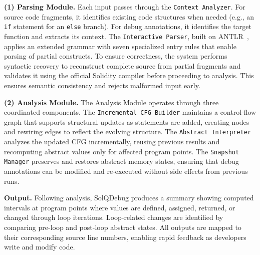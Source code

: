 \documentclass[pdflatex,sn-basic]{sn-jnl}%
\theoremstyle{thmstyleone}%
\theoremstyle{thmstyletwo}%
\theoremstyle{thmstylethree}%
\begin{document}
        \smallskip
        \noindent\textbf{(1) Parsing Module.}
        Each input passes through the \texttt{Context Analyzer}. For source code fragments,
        it identifies existing code structures when needed
        (e.g., an \texttt{if} statement for an \texttt{else} branch).
        For debug annotations, it identifies the target function and extracts its context.
        The \texttt{Interactive Parser}, built on ANTLR~\citep{antlr}, applies an extended grammar with seven specialized
        entry rules that enable parsing of partial constructs. To ensure correctness,
        the system performs syntactic recovery to reconstruct complete source from partial fragments and
        validates it using the official Solidity compiler before proceeding to analysis. This ensures
        semantic consistency and rejects malformed input early.

        \smallskip
        \noindent\textbf{(2) Analysis Module.}
        The Analysis Module operates through three coordinated components. The \texttt{Incremental CFG
        Builder} maintains a control-flow graph that supports structural updates as statements are added,
        creating nodes and rewiring edges to reflect the evolving structure. The \texttt{Abstract Interpreter}
        analyzes the updated CFG incrementally, reusing previous results and recomputing
        abstract values only for affected program points. The \texttt{Snapshot Manager} preserves
        and restores abstract memory states, ensuring that debug annotations can be modified
        and re-executed without side effects from previous runs.

        \smallskip
        \noindent\textbf{Output.}
        Following analysis, SolQDebug produces a summary showing computed intervals at program points
        where values are defined, assigned, returned, or changed through loop iterations. Loop-related changes are identified by comparing pre-loop and post-loop abstract states.
        All outputs are mapped to their corresponding source line numbers, enabling rapid feedback as developers write and modify code.
    
\end{document}
